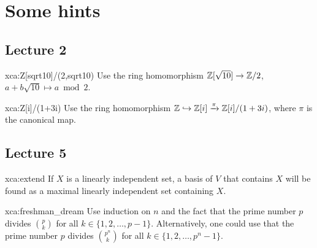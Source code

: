 \chapter*{Some hints}

\section*{Lecture 2}

\begin{sol}{xca:Z[sqrt10]/(2,sqrt10)}
	Use the ring homomorphism $\mathbb{Z}[\sqrt{10}]\to\mathbb{Z}/2$, $a+b\sqrt{10}\mapsto a\bmod 2$. 	
\end{sol}

\begin{sol}{xca:Z[i]/(1+3i)}
	Use the ring homomorphism $\mathbb{Z}\hookrightarrow\mathbb{Z}[i]\xrightarrow{\pi}\mathbb{Z}[i]/(1+3i)$, where
	$\pi$ is the canonical map. 	
\end{sol}

\section*{Lecture 5}

\begin{sol}{xca:extend}
    If $X$ is a linearly independent set, a basis 
    of $V$ that contains $X$ will be found as a maximal linearly independent set 
    containing $X$. 
\end{sol}


\begin{sol}{xca:freshman_dream}
    Use induction on $n$ and the fact that the prime number $p$ divides 
    $\binom{p}{k}$ for all $k\in\{1,2,\dots,p-1\}$. Alternatively, one could use
    that the prime number $p$ divides $\binom{p^n}{k}$ for all 
    $k\in\{1,2,\dots,p^n-1\}$. 
\end{sol}

